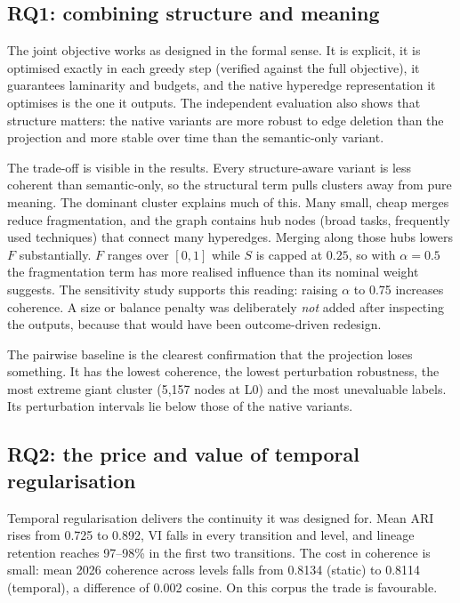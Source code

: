 \documentclass[11pt,a4paper]{article}
\theoremstyle{remark}
\begin{document}
\subsection{RQ1: combining structure and meaning}

The joint objective works as designed in the formal sense. It is explicit, it is optimised
exactly in each greedy step (verified against the full objective), it guarantees laminarity and
budgets, and the native hyperedge representation it optimises is the one it outputs. The
independent evaluation also shows that structure matters: the native variants are more robust
to edge deletion than the projection and more stable over time than the semantic-only
variant.

The trade-off is visible in the results. Every structure-aware variant is less coherent than
semantic-only, so the structural term pulls clusters away from pure meaning. The dominant
cluster explains much of this. Many small, cheap merges reduce fragmentation, and the graph
contains hub nodes (broad tasks, frequently used techniques) that connect many hyperedges.
Merging along those hubs lowers $F$ substantially. $F$ ranges over $[0,1]$ while $S$ is capped at
$0.25$, so with $\alpha=0.5$ the fragmentation term has more realised influence than its nominal
weight suggests. The sensitivity study supports this reading: raising $\alpha$ to 0.75 increases
coherence. A size or balance penalty was deliberately \emph{not} added after inspecting the
outputs, because that would have been outcome-driven redesign.

The pairwise baseline is the clearest confirmation that the projection loses something. It has
the lowest coherence, the lowest perturbation robustness,
the most extreme giant cluster (5{,}157 nodes at L0) and the most unevaluable labels. Its
perturbation intervals lie below those of the native variants.

\subsection{RQ2: the price and value of temporal regularisation}

Temporal regularisation delivers the continuity it was designed for. Mean ARI rises from 0.725
to 0.892, VI falls in every transition and level, and lineage retention reaches 97--98\% in the
first two transitions. The cost in coherence is small: mean 2026 coherence across levels falls
from 0.8134 (static) to 0.8114 (temporal), a difference of 0.002 cosine. On this corpus the
trade is favourable.
\end{document}
